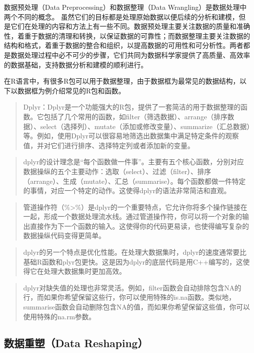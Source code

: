 \documentclass[]{book}
\begin{document}
数据预处理（Data Preprocessing）和数据整理（Data Wrangling）是数据处理中两个不同的概念。
虽然它们的目标都是处理原始数据以便后续的分析和建模，但是它们在处理的内容和方法上有一些不同。数据预处理主要关注数据的质量和准确性，着重于数据的清理和转换，以保证数据的可靠性；而数据整理主要关注数据的结构和格式，着重于数据的整合和组织，以提高数据的可用性和可分析性。两者都是数据处理过程中必不可少的步骤，它们共同为数据科学家提供了高质量、高效率的数据基础，支持数据分析和建模的顺利进行。

在R语言中，有很多R包可以用于数据整理，由于数据框为最常见的数据结构，以下以数据框为例介绍常见的R包和函数。

\begin{quote}
Dplyr：Dplyr是一个功能强大的R包，提供了一套简洁的用于数据整理的函数。它包括了几个常用的函数，如filter（筛选数据）、arrange（排序数据）、select（选择列）、mutate（添加或修改变量）、summarize（汇总数据）等。例如，使用Dplyr可以很容易地筛选出数据集中满足特定条件的观察值，并对它们进行排序、选择特定列或者添加新的变量。
\end{quote}

\begin{quote}
dplyr的设计理念是``每个函数做一件事''。主要有五个核心函数，分别对应数据操纵的五个主要动作：选取（select）、过滤（filter）、排序（arrange）、生成（mutate）、汇总（summarise）。每个函数都做一件特定的事情，对应一个特定的动作。这使得dplyr的语法非常简洁和直观。
\end{quote}

\begin{quote}
管道操作符（\%\textgreater{}\%）是dplyr的一个重要特点，它允许你将多个操作链接在一起，形成一个数据处理流水线。通过管道操作符，你可以将一个对象的输出直接作为下一个函数的输入。这使得你的代码更易读，也使得编写复杂的数据操纵代码变得更简单。
\end{quote}

\begin{quote}
dplyr的另一个特点是优化性能。在处理大数据集时，dplyr的速度通常要比基础R函数和plyr包更快。这是因为dplyr的底层代码是用C++编写的，这使得它在处理大数据集时更加高效。
\end{quote}

\begin{quote}
dplyr对缺失值的处理也非常灵活。例如，filter函数会自动排除包含NA的行，而如果你希望保留这些行，你可以使用特殊的is.na函数。类似地，summarise函数会自动删除包含NA的值，而如果你希望保留这些值，你可以使用特殊的na.rm参数。
\end{quote}

\hypertarget{ux6570ux636eux91cdux5851data-reshaping}{%
\subsection{数据重塑（Data Reshaping）}\label{ux6570ux636eux91cdux5851data-reshaping}}
\end{document}
